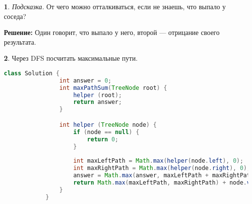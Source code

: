 \documentclass[14pt, a4paper]{extarticle}
\theoremstyle{definition}
\newtheorem{problem}{}
\theoremstyle{definition}
\theoremstyle{remark}
\numberwithin{equation}{section}
\begin{document}
\begin{problem}
    \textit{Подсказка.} От чего можно отталкиваться, если не знаешь, 
    что выпало у соседа?

    \textbf{Решение:} Один говорит, что выпало у него, второй --- 
    отрицание своего результата.
\end{problem}

\begin{problem}
    Через DFS посчитать максимальные пути.
    \begin{footnotesize}
        \begin{lstlisting}[language=Java]
            class Solution {
                int answer = 0;
                int maxPathSum(TreeNode root) {
                    helper (root);
                    return answer;
                }

                int helper (TreeNode node) {
                    if (node == null) {
                        return 0;
                    }
                
                    int maxLeftPath = Math.max(helper(node.left), 0);
                    int maxRightPath = Math.max(helper(node.right), 0);
                    answer = Math.max(answer, maxLeftPath + maxRightPath + node.val);
                    return Math.max(maxLeftPath, maxRightPath) + node.val;
                }
            }
        \end{lstlisting}
    \end{footnotesize}
\end{problem}
\end{document}
